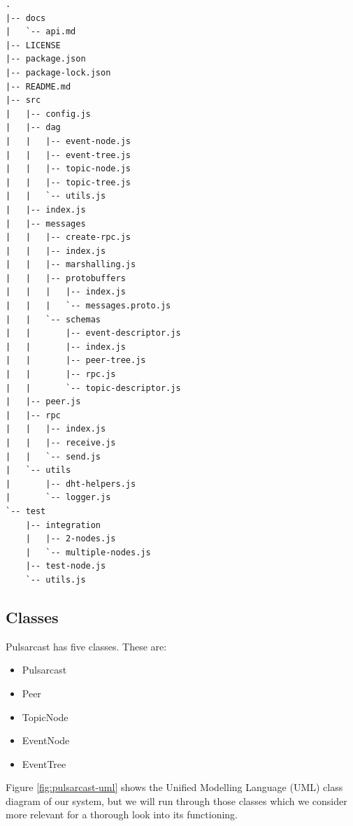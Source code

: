 \begin{lstlisting}[float, caption={File tree for our Pulsarcast implementation},label={file-tree}]
.
|-- docs
|   `-- api.md
|-- LICENSE
|-- package.json
|-- package-lock.json
|-- README.md
|-- src
|   |-- config.js
|   |-- dag
|   |   |-- event-node.js
|   |   |-- event-tree.js
|   |   |-- topic-node.js
|   |   |-- topic-tree.js
|   |   `-- utils.js
|   |-- index.js
|   |-- messages
|   |   |-- create-rpc.js
|   |   |-- index.js
|   |   |-- marshalling.js
|   |   |-- protobuffers
|   |   |   |-- index.js
|   |   |   `-- messages.proto.js
|   |   `-- schemas
|   |       |-- event-descriptor.js
|   |       |-- index.js
|   |       |-- peer-tree.js
|   |       |-- rpc.js
|   |       `-- topic-descriptor.js
|   |-- peer.js
|   |-- rpc
|   |   |-- index.js
|   |   |-- receive.js
|   |   `-- send.js
|   `-- utils
|       |-- dht-helpers.js
|       `-- logger.js
`-- test
    |-- integration
    |   |-- 2-nodes.js
    |   `-- multiple-nodes.js
    |-- test-node.js
    `-- utils.js

\end{lstlisting}

\subsection{Classes}\label{subsec:classes}

Pulsarcast has five classes. These are:

\begin{itemize}
  \item
    Pulsarcast
  \item
		Peer
  \item
    TopicNode
  \item
    EventNode
  \item
    EventTree
\end{itemize}

Figure \ref{fig:pulsarcast-uml} shows the Unified Modelling Language  (UML)
class diagram of our system, but we will run through those classes which we
consider more relevant for a thorough look into its functioning.


